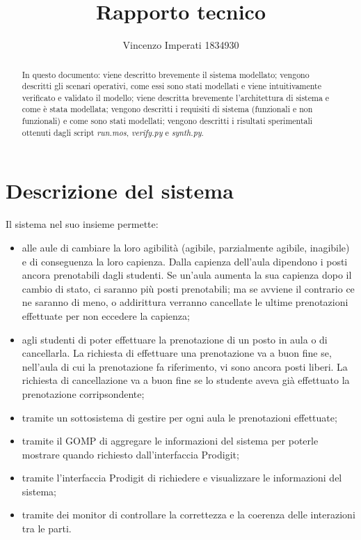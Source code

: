 \documentclass[11pt]{article}
\title{\textbf{Rapporto tecnico}}
\author{Vincenzo Imperati 1834930}
\date{}
\begin{document}
	\maketitle
	\thispagestyle{empty}


	\begin{abstract}
	In questo documento: viene descritto brevemente il sistema modellato; vengono descritti gli scenari operativi, come essi sono stati modellati e viene intuitivamente verificato e validato il modello; viene descritta brevemente l'architettura di sistema e come è stata modellata; vengono descritti i requisiti di sistema (funzionali e non funzionali) e come sono stati modellati; vengono descritti i risultati sperimentali ottenuti dagli script \textit{run.mos}, \textit{verify.py} e \textit{synth.py}.
	\end{abstract}

	\newpage
	\tableofcontents
	
	\newpage
	\section{Descrizione del sistema}
	Il sistema nel suo insieme permette:
	\begin{itemize}
		\itemsep0em
		\item alle aule di cambiare la loro agibilità (agibile, parzialmente agibile, inagibile) e di conseguenza la loro capienza. Dalla capienza dell'aula dipendono i posti ancora prenotabili dagli studenti. Se un'aula aumenta la sua capienza dopo il cambio di stato, ci saranno più posti prenotabili; ma se avviene il contrario ce ne saranno di meno, o addirittura verranno cancellate le ultime prenotazioni effettuate per non eccedere la capienza;
		\item agli studenti di poter effettuare la prenotazione di un posto in aula o di cancellarla. La richiesta di effettuare una prenotazione va a buon fine se, nell'aula di cui la prenotazione fa riferimento, vi sono ancora posti liberi. La richiesta di cancellazione va a buon fine se lo studente aveva già effettuato la prenotazione corripsondente;
		\item tramite un sottosistema di gestire per ogni aula le prenotazioni effettuate;
		\item tramite il GOMP di aggregare le informazioni del sistema per poterle mostrare quando richiesto dall'interfaccia Prodigit;
		\item tramite l'interfaccia Prodigit di richiedere e visualizzare le informazioni del sistema;
		\item tramite dei monitor di controllare la correttezza e la coerenza delle interazioni tra le parti.
	\end{itemize}
	
\end{document}
